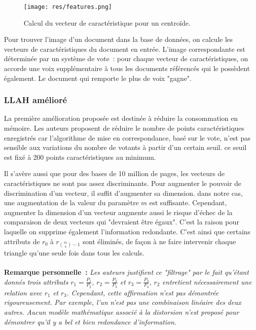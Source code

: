 \documentclass[a4paper]{article}
\begin{document}
\begin{figure}[!h]
\centering
\texttt{[image: res/features.png]}
\caption{\label{fig:features}Calcul du vecteur de caractéristique pour un centroïde.}
\end{figure}

Pour trouver l'image d'un document dans la base de données, on calcule les vecteurs de caractéristiques du document en entrée. L'image correspondante est déterminée par un système de vote~: pour chaque vecteur de caractéristiques, on accorde une voix supplémentaire à tous les documents référencés qui le possèdent également. Le document qui remporte le plus de voix "gagne".

\subsubsection{LLAH amélioré}
La première amélioration proposée est destinée à réduire la consommation en mémoire. Les auteurs proposent de réduire le nombre de points caractéristiques enregistrés car l'algorithme de mise en correspondance, basé sur le vote, n'est pas sensible aux variations du nombre de votants à partir d'un certain seuil. ce seuil est fixé à 200 points caractéristiques au minimum.

Il s'avère aussi que pour des bases de 10 million de pages, les vecteurs de caractéristiques ne sont pas assez discriminants. Pour augmenter le pouvoir de discrimination d'un vecteur, il suffit d'augmenter sa dimension. dans notre cas, une augmentation de la valeur du paramètre $m$ est suffisante. Cependant, augmenter la dimension d'un vecteur augmente aussi le risque d'échec de la comparaison de deux vecteurs qui "devraient être égaux". C'est la raison pour laquelle on supprime également l'information redondante. C'est ainsi que certains attributs de $r_0$ à $r_{{m\choose 4}-1}$ sont éliminés, de façon à ne faire intervenir chaque triangle qu'une seule fois dans tous les calculs.\\
\\

\textbf{Remarque personnelle~:} \textit{Les auteurs justifient ce "filtrage" par le fait qu'étant donnés trois attributs $r_1 = \frac{P_1}{P_2}$, $r_2 = \frac{P_2}{P_3}$ et $r_3 = \frac{P_3}{P_4}$, $r_2$ entretient nécessairement une relation avec $r_1$ et $r_3$. Cependant, cette affirmation n'est pas démontrée rigoureusement. Par exemple, l'un n'est pas une combinaison linéaire des deux autres. Aucun modèle mathématique associé à la distorsion n'est proposé pour démontrer qu'il y a bel et bien redondance d'information.}
\end{document}

